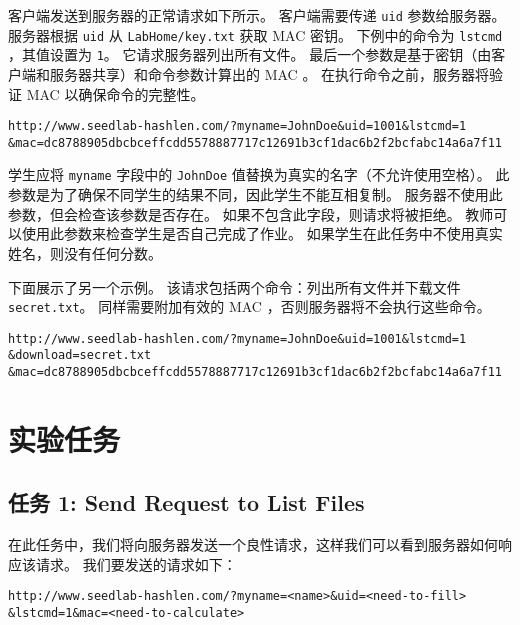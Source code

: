 客户端发送到服务器的正常请求如下所示。
客户端需要传递 \texttt{uid} 参数给服务器。
服务器根据 \texttt{uid} 从 \texttt{LabHome/key.txt} 获取 MAC 密钥。
下例中的命令为 \texttt{lstcmd} ，其值设置为 \texttt{1}。
它请求服务器列出所有文件。
最后一个参数是基于密钥（由客户端和服务器共享）和命令参数计算出的 MAC 。
在执行命令之前，服务器将验证 MAC 以确保命令的完整性。

\begin{lstlisting}
http://www.seedlab-hashlen.com/?myname=JohnDoe&uid=1001&lstcmd=1
&mac=dc8788905dbcbceffcdd5578887717c12691b3cf1dac6b2f2bcfabc14a6a7f11
\end{lstlisting}

学生应将 \texttt{myname} 字段中的 \texttt{JohnDoe} 值替换为真实的名字（不允许使用空格）。
此参数是为了确保不同学生的结果不同，因此学生不能互相复制。
服务器不使用此参数，但会检查该参数是否存在。
如果不包含此字段，则请求将被拒绝。
教师可以使用此参数来检查学生是否自己完成了作业。
如果学生在此任务中不使用真实姓名，则没有任何分数。

下面展示了另一个示例。
该请求包括两个命令：列出所有文件并下载文件 \texttt{secret.txt}。
同样需要附加有效的 MAC ，否则服务器将不会执行这些命令。

\begin{lstlisting}
http://www.seedlab-hashlen.com/?myname=JohnDoe&uid=1001&lstcmd=1
&download=secret.txt
&mac=dc8788905dbcbceffcdd5578887717c12691b3cf1dac6b2f2bcfabc14a6a7f11
\end{lstlisting}



\section{实验任务}


\subsection{任务 1: Send Request to List Files}

在此任务中，我们将向服务器发送一个良性请求，这样我们可以看到服务器如何响应该请求。
我们要发送的请求如下：

\begin{lstlisting}
http://www.seedlab-hashlen.com/?myname=<name>&uid=<need-to-fill>
&lstcmd=1&mac=<need-to-calculate>
\end{lstlisting}

